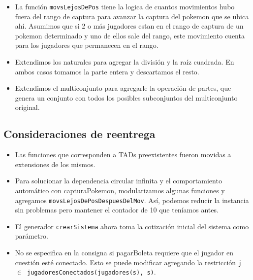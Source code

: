 \begin{itemize}
	\item La función \texttt{movsLejosDePos} tiene la logica de cuantos movimientos hubo fuera del rango de captura para avanzar la captura del pokemon que se ubica ahí. Asumimos que si 2 o más jugadores estan en el rango de captura de un pokemon determinado y uno de ellos sale del rango, este movimiento cuenta para los jugadores que permanecen en el rango.

	\item Extendimos los naturales para agregar la división y la raíz cuadrada. En ambos casos tomamos la parte entera y descartamos el resto.

	\item Extendimos el multiconjunto para agregarle la operación de partes, que genera un conjunto con todos los posibles subconjuntos del multiconjunto original.

\end{itemize}

\subsection{Consideraciones de reentrega}

\begin{itemize}

	\item Las funciones que corresponden a TADs preexistentes fueron movidas a extensiones de los mismos.

	\item Para solucionar la dependencia circular infinita y el comportamiento automático con capturaPokemon, modularizamos algunas funciones y agregamos \texttt{movsLejosDePosDespuesDelMov}. Así, podemos reducir la instancia sin problemas pero mantener el contador de 10 que teníamos antes.

	\item El generador \texttt{crearSistema} ahora toma la cotización inicial del sistema como parámetro.

	\item No se especifica en la consigna si pagarBoleta requiere que el jugador en cuestión esté conectado. Esto se puede modificar agregando la restricción \texttt{j $\in$ jugadoresConectados(jugadores(s), s)}.


\end{itemize}